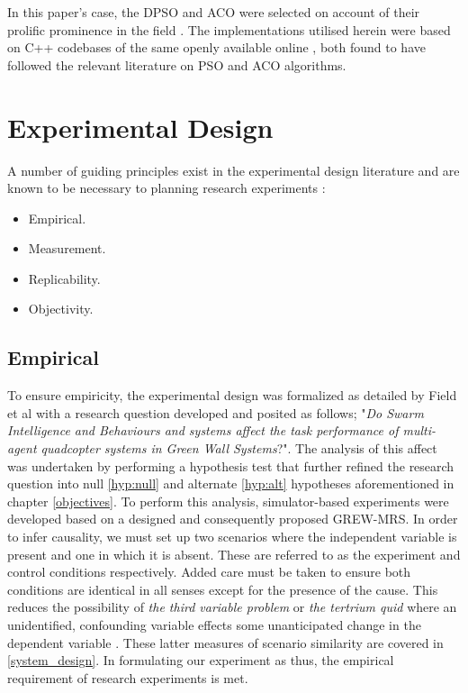 \documentclass{report}
\begin{document}
In this paper's case, the DPSO and ACO were selected on account of their prolific prominence in the field \cite{Selvi2010}. The implementations utilised herein were based on C++ codebases of the same openly available online \cite{PSOTSP} \cite{ACOTSP}, both found to have followed the relevant literature on PSO \cite{Kennedy1995} and ACO \cite{Dorigo1999} algorithms.

\section{Experimental Design}
A number of guiding principles exist in the experimental design literature and are known to be necessary to planning research experiments \cite{Field2012}:
\begin{itemize}
	\item Empirical.
	\item Measurement.
	\item Replicability.
	\item Objectivity.
\end{itemize}

\subsection{Empirical}

To ensure empiricity, the experimental design was formalized as detailed by Field et al \cite{Field2012} with a research question developed and posited as follows; "\textit{Do Swarm Intelligence and Behaviours and systems affect the task performance of multi-agent quadcopter systems in Green Wall Systems}?". The analysis of this affect was undertaken by performing a hypothesis test that further refined the research question into null \ref{hyp:null} and alternate \ref{hyp:alt} hypotheses aforementioned in chapter \ref{objectives}. To perform this analysis, simulator-based experiments were developed based on a designed and consequently proposed GREW-MRS. In order to infer causality, we must set up two scenarios where the independent variable is present and one in which it is absent. These are referred to as the experiment and control conditions respectively. Added care must be taken to ensure both conditions are identical in all senses except for the presence of the cause. This reduces the possibility of \textit{the third variable problem} or \textit{the tertrium quid} where an unidentified, confounding variable effects some unanticipated change in the dependent variable \cite{Field2012}. These latter measures of scenario similarity are covered in \ref{system_design}. In formulating our experiment as thus, the empirical requirement of research experiments is met.
\end{document}
